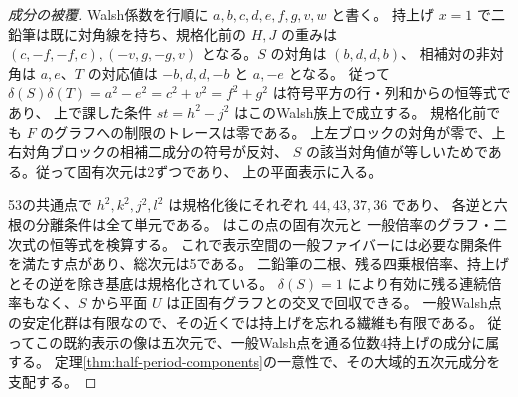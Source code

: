 \begin{proof}[成分の被覆]
Walsh係数を行順に $a,b,c,d,e,f,g,v,w$ と書く。
持上げ $x=1$ で二鉛筆は既に対角線を持ち、規格化前の $H,J$ の重みは
$(c,-f,-f,c),(-v,g,-g,v)$ となる。$S$ の対角は $(b,d,d,b)$、
相補対の非対角は $a,e$、$T$ の対応値は $-b,d,d,-b$ と $a,-e$ となる。
従って $\delta(S)\delta(T)=a^2-e^2=c^2+v^2=f^2+g^2$ は符号平方の行・列和からの恒等式であり、
上で課した条件 $st=h^2-j^2$ はこのWalsh族上で成立する。
規格化前でも $F$ のグラフへの制限のトレースは零である。
上左ブロックの対角が零で、上右対角ブロックの相補二成分の符号が反対、
$S$ の該当対角値が等しいためである。従って固有次元は2ずつであり、
上の平面表示に入る。

53の共通点で $h^2,k^2,j^2,l^2$ は規格化後にそれぞれ $44,43,37,36$ であり、
各逆と六根の分離条件は全て単元である。
 はこの点の固有次元と
一般倍率のグラフ・二次式の恒等式を検算する。
これで表示空間の一般ファイバーには必要な開条件を満たす点があり、総次元は5である。
二鉛筆の二根、残る四乗根倍率、持上げとその逆を除き基底は規格化されている。
$\delta(S)=1$ により有効に残る連続倍率もなく、$S$ から平面 $U$ は正固有グラフとの交叉で回収できる。
一般Walsh点の安定化群は有限なので、その近くでは持上げを忘れる繊維も有限である。
従ってこの既約表示の像は五次元で、一般Walsh点を通る位数4持上げの成分に属する。
定理\ref{thm:half-period-components}の一意性で、その大域的五次元成分を支配する。
\end{proof}
